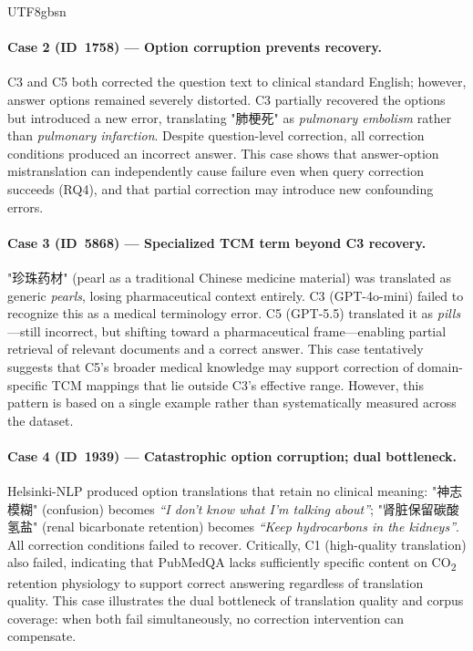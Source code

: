 \documentclass[11pt]{article}
\begin{document}
\begin{CJK}{UTF8}{gbsn}
\paragraph{Case 2 (ID~1758) --- Option corruption prevents recovery.}
C3 and C5 both corrected the question text to clinical standard English; however, answer options remained severely distorted. C3 partially recovered the options but introduced a new error, translating "肺梗死" as \textit{pulmonary embolism} rather than \textit{pulmonary infarction}. Despite question-level correction, all correction conditions produced an incorrect answer. This case shows that answer-option mistranslation can independently cause failure even when query correction succeeds (RQ4), and that partial correction may introduce new confounding errors.

\paragraph{Case 3 (ID~5868) --- Specialized TCM term beyond C3 recovery.}
"珍珠药材" (pearl as a traditional Chinese medicine material) was translated as generic \textit{pearls}, losing pharmaceutical context entirely. C3 (GPT-4o-mini) failed to recognize this as a medical terminology error. C5 (GPT-5.5) translated it as \textit{pills}---still incorrect, but shifting toward a pharmaceutical frame---enabling partial retrieval of relevant documents and a correct answer. This case tentatively suggests that C5's broader medical knowledge may support correction of domain-specific TCM mappings that lie outside C3's effective range. However, this pattern is based on a single example rather than systematically measured across the dataset.

\paragraph{Case 4 (ID~1939) --- Catastrophic option corruption; dual bottleneck.}
Helsinki-NLP produced option translations that retain no clinical meaning: "神志模糊" (confusion) becomes \textit{``I don't know what I'm talking about''}; "肾脏保留碳酸氢盐" (renal bicarbonate retention) becomes \textit{``Keep hydrocarbons in the kidneys''}. All correction conditions failed to recover. Critically, C1 (high-quality translation) also failed, indicating that PubMedQA lacks sufficiently specific content on CO\textsubscript{2} retention physiology to support correct answering regardless of translation quality. This case illustrates the dual bottleneck of translation quality and corpus coverage: when both fail simultaneously, no correction intervention can compensate.


\end{CJK}
\end{document}
